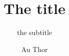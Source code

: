 \author{Au Thor}
\title{The title}
\subtitle{the subtitle}
\renewcommand{\lsSeries}{dummyseries}
\renewcommand{\lsSeriesNumber}{ }
